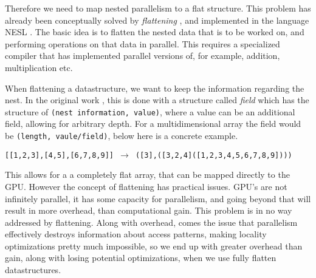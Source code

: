 Therefore we need to map nested parallelism to a flat structure. This problem has already been conceptually solved by \textit{flattening} \cite{flat}, and implemented in the language NESL \cite{nesl}. The basic idea is to flatten the nested data that is to be worked on, and performing operations on that data in parallel. This requires a specialized compiler that has implemented parallel versions of, for example, addition, multiplication etc. 

When flattening a datastructure, we want to keep the information regarding the nest. In the original work \cite{flat}, this is done with a structure called \textit{field} which has the structure of \texttt{(nest information, value)}, where a value can be an additional field, allowing for arbitrary depth. For a multidimensional array the field would be \texttt{(length, vaule/field)}, below here is a concrete example.
\begin{center}
\texttt{[[1,2,3],[4,5],[6,7,8,9]] $\to$ ([3],([3,2,4]([1,2,3,4,5,6,7,8,9])))}
\end{center}
This allows for a a completely flat array, that can be mapped directly to the GPU. However the concept of flattening has practical issues. GPU's are not infinitely parallel, it has some capacity for parallelism, and going beyond that will result in more overhead, than computational gain. This problem is in no way addressed by flattening. Along with overhead, comes the issue that parallelism effectively destroys information about access patterns, making locality optimizations pretty much impossible, so we end up with greater overhead than gain, along with losing potential optimizations, when we use fully flatten datastructures. 

